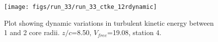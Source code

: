 \begin{figure}[H]
\centering
\texttt{[image: figs/run\_33/run\_33\_ctke\_12rdynamic]}
\caption{Plot showing dynamic variations in turbulent kinetic energy between 1 and 2 core radii. $z/c$=8.50, $V_{free}$=19.08, station 4.}
\label{fig:run_33_ctke_12rdynamic}
\end{figure}


